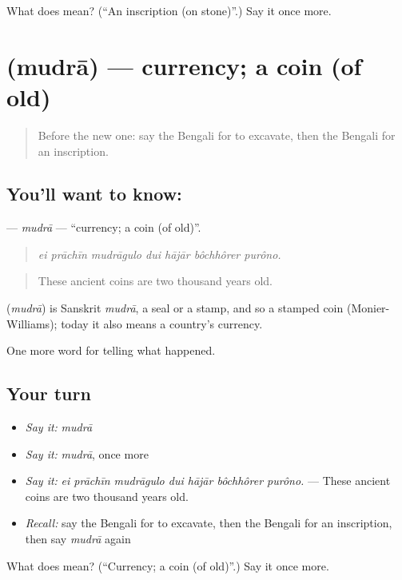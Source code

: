 \begin{tcolorbox}[breakable,colback=teal!4,colframe=teal!35!black,title={Before you move on}]
What does  mean? (\textquotedblleft{}An inscription (on stone)\textquotedblright{}.) Say it once more.
\end{tcolorbox}
\section[\texorpdfstring{\bn{মুদ্রা} (mudrā)}{মুদ্রা (mudrā)}]{ (mudrā) — currency; a coin (of old)}

\label{lesson:BN-C319-mudra}



\begin{quote}
Before the new one: say the Bengali for to excavate, then the Bengali for an inscription.
\end{quote}

\subsection*{You'll want to know: }
\textbf{} — \emph{mudrā} — \textquotedblleft{}currency; a coin (of old)\textquotedblright{}.

\begin{quote}
      
\end{quote}

\begin{quote}
\emph{ei prāchīn mudrāgulo dui hājār bôchhôrer purôno.}
\end{quote}

\begin{quote}
These ancient coins are two thousand years old.
\end{quote}

\begin{cousinweb}
\textbf{} (\emph{mudrā}) is Sanskrit \emph{mudrā}, a seal or a stamp, and so a stamped coin (Monier-Williams); today it also means a country's currency.
\end{cousinweb}

\begin{grammarlens}[title={What you've built}]
One more word for telling what happened.
\end{grammarlens}

\subsection*{Your turn}
\begin{itemize}
\raggedright
  \item \emph{Say it:} \emph{mudrā}
  \item \emph{Say it:} \emph{mudrā}, once more
  \item \emph{Say it:} \emph{ei prāchīn mudrāgulo dui hājār bôchhôrer purôno.} — These ancient coins are two thousand years old.
  \item \emph{Recall:} say the Bengali for to excavate, then the Bengali for an inscription, then say \emph{mudrā} again
\end{itemize}

\begin{tcolorbox}[breakable,colback=teal!4,colframe=teal!35!black,title={Before you move on}]
What does  mean? (\textquotedblleft{}Currency; a coin (of old)\textquotedblright{}.) Say it once more.
\end{tcolorbox}
